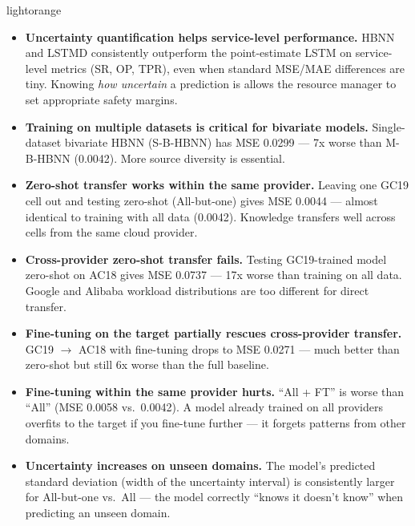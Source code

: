 \documentclass[12pt,a4paper]{article}
\begin{document}
\begin{keybox}{lightorange}
\begin{itemize}[leftmargin=*,noitemsep]
  \item \textbf{Uncertainty quantification helps service-level performance.}
        HBNN and LSTMD consistently outperform the point-estimate LSTM on
        service-level metrics (SR, OP, TPR), even when standard MSE/MAE
        differences are tiny. Knowing \emph{how uncertain} a prediction is
        allows the resource manager to set appropriate safety margins.
  \item \textbf{Training on multiple datasets is critical for bivariate models.}
        Single-dataset bivariate HBNN (S-B-HBNN) has MSE 0.0299 --- 7x worse
        than M-B-HBNN (0.0042). More source diversity is essential.
  \item \textbf{Zero-shot transfer works within the same provider.}
        Leaving one GC19 cell out and testing zero-shot (All-but-one) gives
        MSE 0.0044 --- almost identical to training with all data (0.0042).
        Knowledge transfers well across cells from the same cloud provider.
  \item \textbf{Cross-provider zero-shot transfer fails.}
        Testing GC19-trained model zero-shot on AC18 gives MSE 0.0737 ---
        17x worse than training on all data. Google and Alibaba workload
        distributions are too different for direct transfer.
  \item \textbf{Fine-tuning on the target partially rescues cross-provider transfer.}
        GC19 $\to$ AC18 with fine-tuning drops to MSE 0.0271 ---
        much better than zero-shot but still 6x worse than the full baseline.
  \item \textbf{Fine-tuning within the same provider hurts.}
        ``All + FT'' is worse than ``All'' (MSE 0.0058 vs.\ 0.0042). A model
        already trained on all providers overfits to the target if you
        fine-tune further --- it forgets patterns from other domains.
  \item \textbf{Uncertainty increases on unseen domains.}
        The model's predicted standard deviation (width of the uncertainty
        interval) is consistently larger for All-but-one vs.\ All ---
        the model correctly ``knows it doesn't know'' when predicting an
        unseen domain.
\end{itemize}
\end{keybox}

\end{document}
